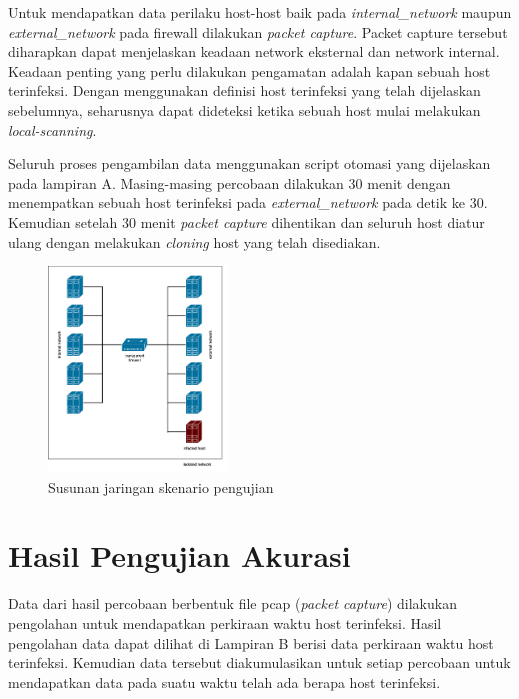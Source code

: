 Untuk mendapatkan data perilaku host-host baik pada \textit{internal\_network} maupun \textit{external\_network} pada firewall dilakukan \textit{packet capture}. Packet capture tersebut diharapkan dapat menjelaskan keadaan network eksternal dan network internal. Keadaan penting yang perlu dilakukan pengamatan adalah kapan sebuah host terinfeksi. Dengan menggunakan definisi host terinfeksi yang telah dijelaskan sebelumnya, seharusnya dapat dideteksi ketika sebuah host mulai melakukan \textit{local-scanning}.

Seluruh proses pengambilan data menggunakan script otomasi yang dijelaskan pada lampiran A. Masing-masing percobaan dilakukan 30 menit dengan menempatkan sebuah host terinfeksi pada \textit{external\_network} pada detik ke 30. Kemudian setelah 30 menit \textit{packet capture} dihentikan dan seluruh host diatur ulang dengan melakukan \textit{cloning} host yang telah disediakan.

\begin{figure}[H]
	\centering
	\includegraphics[width=180px]{resources/skenario_pengujian.png}
	\caption{Susunan jaringan skenario pengujian}
	\label{fig:validation_scenario}
\end{figure}

\section{Hasil Pengujian Akurasi}

Data dari hasil percobaan berbentuk file pcap (\textit{packet capture}) dilakukan pengolahan untuk mendapatkan perkiraan waktu host terinfeksi. Hasil pengolahan data dapat dilihat di Lampiran B berisi data perkiraan waktu host terinfeksi. Kemudian data tersebut diakumulasikan untuk setiap percobaan untuk mendapatkan data pada suatu waktu telah ada berapa host terinfeksi.

